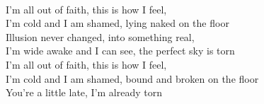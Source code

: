 \\
I'm all out of faith, this is how I feel, \\
I'm cold and I am shamed, lying naked on the floor \\
Illusion never changed, into something real, \\
I'm wide awake and I can see, the perfect sky is torn \\
I'm all out of faith, this is how I feel, \\
I'm cold and I am shamed, bound and broken on the floor \\
You're a little late, I'm already torn \\
\\
